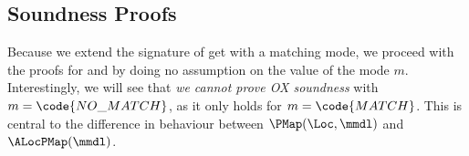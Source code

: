 
\subsection{Soundness Proofs}

Because we extend the signature of get with a matching mode, we proceed with the proofs for  and  by doing no assumption on the value of the mode $m$. Interestingly, we will see that \emph{we cannot prove OX soundness} with $m=\code{NO\_MATCH}$, as it only holds for $m=\code{MATCH}$. This is central to the difference in behaviour between $\PMap(\Loc, \mmdl)$ and $\ALocPMap(\mmdl)$.

